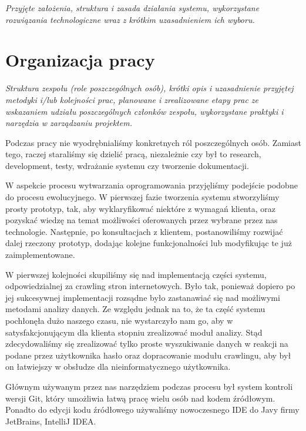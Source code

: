 \documentclass[polish,12pt]{aghthesis}
\begin{document}
\emph{Przyjęte założenia, struktura i zasada działania systemu,
  wykorzystane rozwiązania technologiczne wraz z krótkim uzasadnieniem
  ich wyboru.}

\section{Organizacja pracy}
\label{sec:organizacja-pracy}

\emph{Struktura zespołu (role poszczególnych osób), krótki opis i
  uzasadnienie przyjętej metodyki i/lub kolejności prac, planowane i
  zrealizowane etapy prac ze wskazaniem udziału poszczególnych
  członków zespołu, wykorzystane praktyki i narzędzia w zarządzaniu
  projektem.}

Podczas pracy nie wyodrębnialiśmy konkretnych ról poszczególnych osób. Zamiast tego, raczej staraliśmy się dzielić pracą, niezależnie czy
był to
research, development, testy, wdrażanie systemu czy tworzenie dokumentacji.

W aspekcie procesu wytwarzania oprogramowania przyjęliśmy podejście podobne do procesu ewolucyjnego. W pierwszej fazie tworzenia systemu 
stworzyliśmy prosty prototyp, tak, aby wyklaryfikować niektóre z wymagań klienta, oraz pozyskać wiedzę na temat możliwości oferowanych
przez wybrane przez nas technologie. Następnie, po konsultacjach z klientem, postanowiliśmy rozwijać dalej rzeczony prototyp, dodając 
kolejne funkcjonalności lub modyfikując te już zaimplementowane. 

W pierwszej kolejności skupiliśmy się nad implementacją części systemu, odpowiedzialnej za crawling stron internetowych. Było tak, ponieważ
dopiero po jej sukcesywnej implementacji rozsądne było zastanawiać się nad możliwymi metodami analizy danych. Ze względu jednak na to, że 
ta część systemu pochłonęła dużo naszego czasu, nie wystarczyło nam go, aby w satysfakcjonującym dla klienta stopniu zrealizować moduł analizy.
Stąd zdecydowaliśmy się zrealizować tylko proste wyszukiwanie danych w reakcji na podane przez użytkownika hasło oraz dopracowanie modułu crawlingu,
aby był on łatwiejszy w obsłudze dla nieinformatycznego użytkownika. 

Głównym używanym przez nas narzędziem podczas procesu był system kontroli wersji Git, który umożliwia łatwą pracę wielu osób nad kodem źródłowym.
Ponadto do edycji kodu źródłowego używaliśmy nowoczesnego IDE do Javy firmy JetBrains, IntelliJ IDEA.
\end{document}
